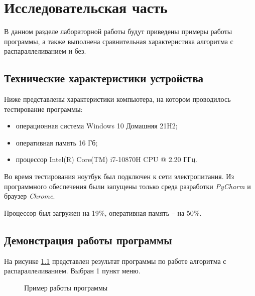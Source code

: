 \chapter{Исследовательская часть}

В данном разделе лабораторной работы будут приведены примеры работы программы, а также выполнена сравнительная характеристика алгоритма с распараллеливанием и без.

\section{Технические характеристики устройства}

Ниже представлены характеристики компьютера, на котором проводилось тестирование программы:
\begin{itemize}
    \item операционная система Windows 10 Домашняя 21H2;
    \item оперативная память 16 Гб;
    \item процессор Intel(R) Core(TM) i7-10870H CPU @ 2.20 ГГц.
\end{itemize}

Во время тестирования ноутбук был подключен к сети электропитания. Из программного обеспечения были запущены только среда разработки \textit{PyCharm} и браузер \textit{Chrome}.

Процессор был загружен на 19\%, оперативная память -- на 50\%.

\section{Демонстрация работы программы}

На рисунке \ref{img:example} представлен результат программы по работе алгоритма с распараллеливанием. Выбран 1 пункт меню.

\begin{figure}[h!]
		\caption{Пример работы программы}
		\label{img:example}
	\end{figure}

